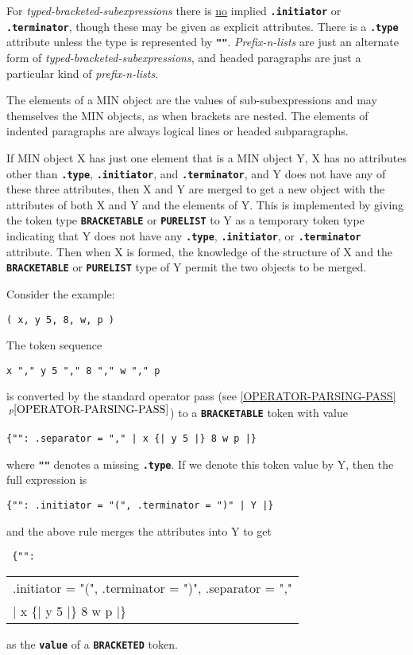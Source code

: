 \documentclass[12pt]{article}
\newcommand{\TT}[1]{{\tt \bfseries #1}}
\newcommand{\itemref}[1]{\ref{#1}$\,^{p\pageref{#1}}$}
\begin{document}
For {\em typed-bracketed-subexpressions} there is \underline{no}
implied \TT{.initiator} or \TT{.terminator}, though these may
be given as explicit attributes.  There is a \TT{.type}
attribute unless the type is represented by \TT{""}.
{\em Prefix-n-lists} are just an alternate form of
{\em typed-bracketed-sub\-ex\-pres\-sions}, and headed paragraphs
are just a particular kind of {\em prefix-n-lists}.

The elements of a MIN object are the values of sub-subexpressions and
may themselves the MIN objects, as when brackets are nested.  The
elements of indented paragraphs are always logical lines or
headed subparagraphs.

If MIN object X has just one element that is a MIN object Y,
X has no attributes other than \TT{.type}, \TT{.initiator},
and \TT{.terminator}, and Y does not have any of these three
attributes, then X and Y are merged to get a new object with
the attributes of both X and Y and the elements of Y.  This is implemented
by giving the token type
\TT{BRACKETABLE} or \TT{PURELIST}
to Y as a temporary token type indicating that Y
does not have any \TT{.type}, \TT{.initiator}, or \TT{.terminator}
attribute.  Then when X is formed, the knowledge of the structure
of X and the \TT{BRACKETABLE} or \TT{PURELIST} type of Y permit the two objects
to be merged.%
\label{MERGING-BRACKETABLE-TOKENS}

Consider the example:
\begin{center}
\tt ( x, y 5, 8, w, p )
\end{center}

The token sequence
\begin{center}
\tt x "," y 5 "," 8 "," w "," p
\end{center}
is converted by the standard operator pass
(see \itemref{OPERATOR-PARSING-PASS})
to a \TT{BRACKETABLE} token with value
\begin{center}
\tt \{"": .separator = "," | x  \{| y 5 |\} 8 w p |\}
\end{center}
where \TT{""} denotes a missing \TT{.type}.
If we denote this token value by Y,
then the full expression is
\begin{center}
\tt \{"": .initiator = "(", .terminator = ")" | Y |\}
\end{center}
and the above rule merges the attributes into Y to get
\begin{center}
\tt
\{"": \begin{tabular}[t]{l}
      .initiator = "(", .terminator = ")", .separator = "," \\
      | x  \{| y 5 |\} 8 w p |\}
      \end{tabular}
\end{center}
as the \TT{value} of a \TT{BRACKETED} token.
\end{document}
